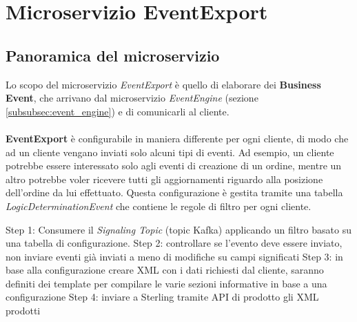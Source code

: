 \chapter{Microservizio EventExport}
\label{cap:MicroservizioEventExport}

\section{Panoramica del microservizio}
\label{sec:ScopoDelMicroservizio}
Lo scopo del microservizio \textit{EventExport} è quello di elaborare dei \textbf{Business Event}, che arrivano dal microservizio \textit{EventEngine} 
(sezione \ref{subsubsec:event_engine}) e di comunicarli al cliente.\\\\

\textbf{EventExport} è configurabile in maniera differente per ogni cliente, di modo che ad un cliente vengano inviati solo alcuni tipi di eventi.
Ad esempio, un cliente potrebbe essere interessato solo agli eventi di creazione di un ordine, mentre un altro potrebbe voler ricevere tutti gli aggiornamenti
riguardo alla posizione dell'ordine da lui effettuato.
Questa configurazione è gestita tramite una tabella \textit{LogicDeterminationEvent} che contiene le regole di filtro per ogni cliente.


Step 1: Consumere il \textit{Signaling Topic} (topic Kafka) applicando un filtro basato su una tabella di configurazione.
Step 2: controllare se l’evento deve essere inviato, non inviare eventi già inviati a meno di modifiche su campi significati
Step 3: in base alla configurazione creare XML con i dati richiesti dal cliente, saranno definiti dei template per compilare le varie sezioni informative in base a una configurazione
Step 4: inviare a Sterling tramite API di prodotto gli XML prodotti
